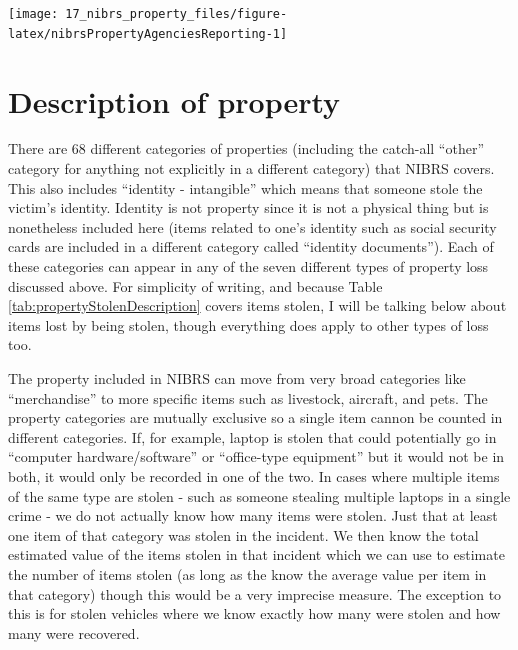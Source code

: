 \documentclass[
]{krantz}
\let\origfigure\figure
\let\endorigfigure\endfigure
\renewenvironment{figure}[1][2] {
    \expandafter\origfigure\expandafter[H]
} {
    \endorigfigure
}
\begin{document}
\begin{figure}

{\centering \texttt{[image: 17\_nibrs\_property\_files/figure-latex/nibrsPropertyAgenciesReporting-1]} 

}

\caption{The annual number of agencies reporting data in the NIBRS Property Segment, 1991-2022.}\label{fig:nibrsPropertyAgenciesReporting}
\end{figure}

\section{Description of
property}\label{description-of-property}

There are 68 different categories of properties (including
the catch-all ``other'' category for anything not explicitly
in a different category) that NIBRS covers. This also
includes ``identity - intangible'' which means that someone
stole the victim's identity. Identity is not property since
it is not a physical thing but is nonetheless included here
(items related to one's identity such as social security
cards are included in a different category called ``identity
documents''). Each of these categories can appear in any of
the seven different types of property loss discussed above.
For simplicity of writing, and because Table
\ref{tab:propertyStolenDescription} covers items stolen, I
will be talking below about items lost by being stolen,
though everything does apply to other types of loss too.

The property included in NIBRS can move from very broad
categories like ``merchandise'' to more specific items such
as livestock, aircraft, and pets. The property categories
are mutually exclusive so a single item cannon be counted in
different categories. If, for example, laptop is stolen that
could potentially go in ``computer hardware/software'' or
``office-type equipment'' but it would not be in both, it
would only be recorded in one of the two. In cases where
multiple items of the same type are stolen - such as someone
stealing multiple laptops in a single crime - we do not
actually know how many items were stolen. Just that at least
one item of that category was stolen in the incident. We
then know the total estimated value of the items stolen in
that incident which we can use to estimate the number of
items stolen (as long as the know the average value per item
in that category) though this would be a very imprecise
measure. The exception to this is for stolen vehicles where
we know exactly how many were stolen and how many were
recovered.
\end{document}
